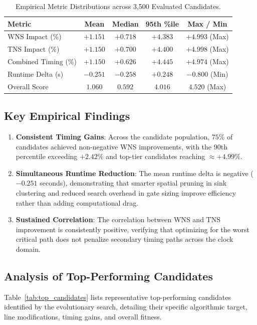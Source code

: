 \documentclass[10pt,twocolumn]{article}
\begin{document}
\begin{table}[h]
\centering
\caption{Empirical Metric Distributions across 3,500 Evaluated Candidates.}
\label{tab:summary_stats}
\vspace{0.4em}
\scriptsize
\setlength{\tabcolsep}{2.5pt}
\begin{tabular}{|l|c|c|c|c|}
\hline
\textbf{Metric} & \textbf{Mean} & \textbf{Median} & \textbf{95th \%ile} & \textbf{Max / Min} \\
\hline
WNS Impact (\%) & $+1.151$ & $+0.718$ & $+4.383$ & $+4.993$ (Max) \\
TNS Impact (\%) & $+1.150$ & $+0.700$ & $+4.400$ & $+4.998$ (Max) \\
Combined Timing (\%) & $+1.150$ & $+0.626$ & $+4.445$ & $+4.974$ (Max) \\
Runtime Delta (s) & $-0.251$ & $-0.258$ & $+0.248$ & $-0.800$ (Min) \\
Overall Score & $1.060$ & $0.592$ & $4.016$ & $4.520$ (Max) \\
\hline
\end{tabular}
\end{table}

\subsection{Key Empirical Findings}
\begin{enumerate}
    \item \textbf{Consistent Timing Gains}: Across the candidate population, $75\%$ of candidates achieved non-negative WNS improvements, with the 90th percentile exceeding $+2.42\%$ and top-tier candidates reaching $\approx +4.99\%$.
    \item \textbf{Simultaneous Runtime Reduction}: The mean runtime delta is negative ($-0.251$ seconds), demonstrating that smarter spatial pruning in sink clustering and reduced search overhead in gate sizing improve efficiency rather than adding computational drag.
    \item \textbf{Sustained Correlation}: The correlation between WNS and TNS improvement is consistently positive, verifying that optimizing for the worst critical path does not penalize secondary timing paths across the clock domain.
\end{enumerate}

\subsection{Analysis of Top-Performing Candidates}
Table~\ref{tab:top_candidates} lists representative top-performing candidates identified by the evolutionary search, detailing their specific algorithmic target, line modifications, timing gains, and overall fitness.
\end{document}
